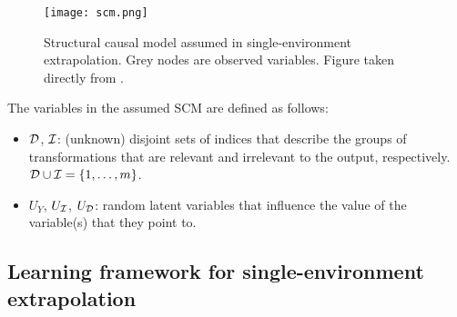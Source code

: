 \begin{figure}[H]
\centering
\texttt{[image: scm.png]}
\caption{Structural causal model assumed in single-environment extrapolation. Grey nodes are observed variables. Figure taken directly from \parencite{Mouli:2021}.}
\label{fig:scm}
\end{figure}

The variables in the assumed SCM are defined as follows:
\begin{itemize}

\item
$\mathcal{D}$, $\mathcal{I}$: (unknown) disjoint sets of indices that describe the groups of transformations that are relevant and irrelevant to the output, respectively. $\mathcal{D}\cup\mathcal{I}=\{1,\ldots,m\}$.

\item
$U_Y$, $U_{\mathcal{I}}$, $U_{\mathcal{D}}$: random latent variables that influence the value of the variable(s) that they point to.

\end{itemize}


\subsection{Learning framework for single-environment extrapolation}
